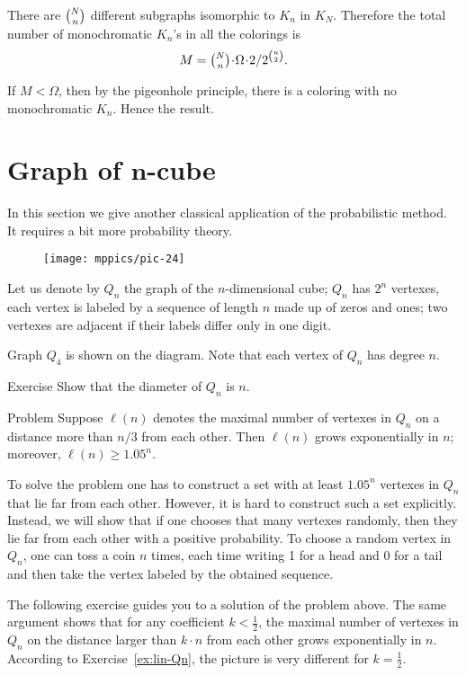 There are $\tbinom Nn$ different subgraphs isomorphic to $K_n$ in $K_N$.
Therefore the total number of monochromatic $K_n$'s in all the colorings 
is 
\[M=\tbinom Nn\cdot\Omega\cdot  2/2^{\binom n2}.\]

If $M<\Omega$, then by the pigeonhole principle,
there is a coloring with no monochromatic $K_n$.
Hence the result.
\qeds

\section*{Graph of $\bm{n}$-cube}

In this section we give another classical application of the probabilistic method.
It requires a bit more probability theory. 

\begin{wrapfigure}{o}{25mm}
\vskip-0mm
\centering
\texttt{[image: mppics/pic-24]}
\vskip-0mm
\end{wrapfigure}

Let us denote by $Q_n$ the graph of the $n$-dimensional cube;
$Q_n$ has $2^n$ vertexes, each vertex is labeled by a sequence of length $n$ made up of zeros and ones;
two vertexes are adjacent if their labels differ only in one digit.

Graph $Q_4$ is shown on the diagram.
Note that each vertex of $Q_n$ has degree $n$.


\begin{thm}{Exercise}
Show that the diameter of $Q_n$ is $n$. 
\end{thm}


\begin{thm}{Problem}\label{prob:Qn}
Suppose $\ell(n)$ denotes the maximal number of vertexes in $Q_n$ on a distance more than $n/3$ from each other.
Then $\ell(n)$ grows exponentially in $n$;
moreover, $\ell(n)\ge 1.05^n$. 
\end{thm}

To solve the problem one has to construct a set with at least $1.05^n$ vertexes in $Q_n$ that lie far from each other.
However, it is hard to construct such a set explicitly.
Instead, we will show that if one chooses that many vertexes randomly, then they lie far from each other with a positive probability.
To choose a random vertex in $Q_n$, one can toss a coin $n$ times, each time writing 1 for a head and 0 for a tail and then take the vertex labeled by the obtained sequence.

The following exercise guides you to a solution of the problem above.
The same argument shows that for any coefficient $k<\tfrac12$, the maximal number of vertexes in $Q_n$ on the distance larger than $k\cdot n$ from each other grows exponentially in $n$.
According to Exercise~\ref{ex:lin-Qn}, the picture is very different for $k= \tfrac12$.

